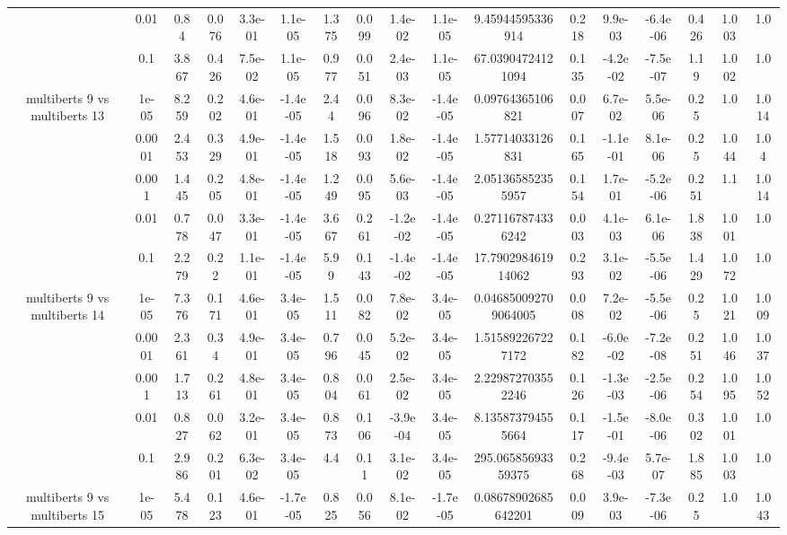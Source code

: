 \begin{tabular}{|c|c|c|c|c|c|c|c|c|c|c|c|c|c|c|c|c|}
 & 0.01 & 0.84 & 0.076 & 3.3e-01 & 1.1e-05 & 1.375 & 0.099 & 1.4e-02 & 1.1e-05 & 9.45944595336914 & 0.218 & 9.9e-03 & -6.4e-06 & 0.426 & 1.003 & 1.0 \\
 & 0.1 & 3.867 & 0.426 & 7.5e-02 & 1.1e-05 & 0.977 & 0.051 & 2.4e-03 & 1.1e-05 & 67.03904724121094 & 0.135 & -4.2e-02 & -7.5e-07 & 1.19 & 1.002 & 1.0 \\
\hline
\multirow{5}{*}{multiberts 9 vs multiberts 13} & 1e-05 & 8.259 & 0.202 & 4.6e-01 & -1.4e-05 & 2.44 & 0.096 & 8.3e-02 & -1.4e-05 & 0.09764365106821 & 0.007 & 6.7e-02 & 5.5e-06 & 0.25 & 1.0 & 1.014 \\
 & 0.0001 & 2.453 & 0.329 & 4.9e-01 & -1.4e-05 & 1.518 & 0.093 & 1.8e-02 & -1.4e-05 & 1.57714033126831 & 0.165 & -1.1e-01 & 8.1e-06 & 0.25 & 1.044 & 1.04 \\
 & 0.001 & 1.445 & 0.205 & 4.8e-01 & -1.4e-05 & 1.249 & 0.095 & 5.6e-03 & -1.4e-05 & 2.051365852355957 & 0.154 & 1.7e-01 & -5.2e-06 & 0.251 & 1.1 & 1.014 \\
 & 0.01 & 0.778 & 0.047 & 3.3e-01 & -1.4e-05 & 3.667 & 0.261 & -1.2e-02 & -1.4e-05 & 0.271167874336242 & 0.003 & 4.1e-03 & 6.1e-06 & 1.838 & 1.001 & 1.0 \\
 & 0.1 & 2.279 & 0.22 & 1.1e-01 & -1.4e-05 & 5.99 & 0.143 & -1.4e-02 & -1.4e-05 & 17.790298461914062 & 0.293 & 3.1e-02 & -5.5e-06 & 1.429 & 1.072 & 1.0 \\
\hline
\multirow{5}{*}{multiberts 9 vs multiberts 14} & 1e-05 & 7.376 & 0.171 & 4.6e-01 & 3.4e-05 & 1.511 & 0.082 & 7.8e-02 & 3.4e-05 & 0.046850092709064005 & 0.008 & 7.2e-02 & -5.5e-06 & 0.25 & 1.021 & 1.009 \\
 & 0.0001 & 2.361 & 0.34 & 4.9e-01 & 3.4e-05 & 0.796 & 0.045 & 5.2e-02 & 3.4e-05 & 1.515892267227172 & 0.182 & -6.0e-02 & -7.2e-08 & 0.251 & 1.046 & 1.037 \\
 & 0.001 & 1.713 & 0.261 & 4.8e-01 & 3.4e-05 & 0.804 & 0.061 & 2.5e-02 & 3.4e-05 & 2.229872703552246 & 0.126 & -1.3e-03 & -2.5e-06 & 0.254 & 1.095 & 1.052 \\
 & 0.01 & 0.827 & 0.062 & 3.2e-01 & 3.4e-05 & 0.873 & 0.106 & -3.9e-04 & 3.4e-05 & 8.135873794555664 & 0.117 & -1.5e-01 & -8.0e-06 & 0.302 & 1.001 & 1.0 \\
 & 0.1 & 2.986 & 0.201 & 6.3e-02 & 3.4e-05 & 4.4 & 0.11 & 3.1e-02 & 3.4e-05 & 295.06585693359375 & 0.268 & -9.4e-03 & 5.7e-07 & 1.885 & 1.003 & 1.0 \\
\hline
\multirow{5}{*}{multiberts 9 vs multiberts 15} & 1e-05 & 5.478 & 0.123 & 4.6e-01 & -1.7e-05 & 0.825 & 0.056 & 8.1e-02 & -1.7e-05 & 0.08678902685642201 & 0.009 & 3.9e-03 & -7.3e-06 & 0.25 & 1.0 & 1.043 \\

\end{tabular}
